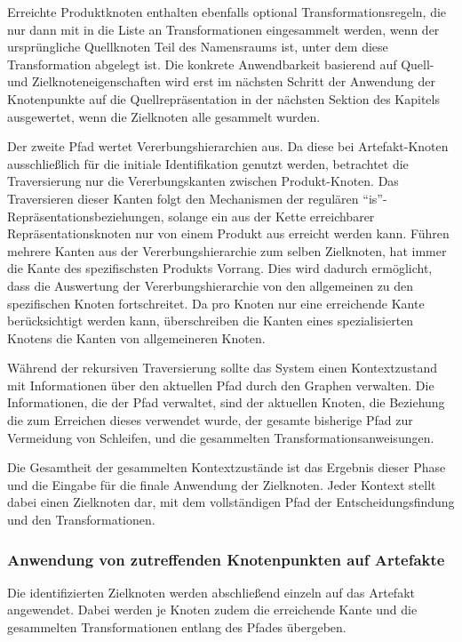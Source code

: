 Erreichte Produktknoten enthalten ebenfalls optional Transformationsregeln, die nur dann mit in die Liste an Transformationen eingesammelt werden, wenn der ursprüngliche Quellknoten Teil des Namensraums ist, unter dem diese Transformation abgelegt ist.
Die konkrete Anwendbarkeit basierend auf Quell- und Zielknoteneigenschaften wird erst im nächsten Schritt der Anwendung der Knotenpunkte auf die Quellrepräsentation in der nächsten Sektion des Kapitels ausgewertet, wenn die Zielknoten alle gesammelt wurden.

Der zweite Pfad wertet Vererbungshierarchien aus.
Da diese bei Artefakt-Knoten ausschließlich für die initiale Identifikation genutzt werden, betrachtet die Traversierung nur die Vererbungskanten zwischen Produkt-Knoten.
Das Traversieren dieser Kanten folgt den Mechanismen der regulären \enquote{is}-Repräsentationsbeziehungen, solange ein aus der Kette erreichbarer Repräsentationsknoten nur von einem Produkt aus erreicht werden kann.
Führen mehrere Kanten aus der Vererbungshierarchie zum selben Zielknoten, hat immer die Kante des spezifischsten Produkts Vorrang.
Dies wird dadurch ermöglicht, dass die Auswertung der Vererbungshierarchie von den allgemeinen zu den spezifischen Knoten fortschreitet.
Da pro Knoten nur eine erreichende Kante berücksichtigt werden kann, überschreiben die Kanten eines spezialisierten Knotens die Kanten von allgemeineren Knoten.

Während der rekursiven Traversierung sollte das System einen Kontextzustand mit Informationen über den aktuellen Pfad durch den Graphen verwalten.
Die Informationen, die der Pfad verwaltet, sind der aktuellen Knoten, die Beziehung die zum Erreichen dieses verwendet wurde, der gesamte bisherige Pfad zur Vermeidung von Schleifen, und die gesammelten Transformationsanweisungen.

Die Gesamtheit der gesammelten Kontextzustände ist das Ergebnis dieser Phase und die Eingabe für die finale Anwendung der Zielknoten.
Jeder Kontext stellt dabei einen Zielknoten dar, mit dem vollständigen Pfad der Entscheidungsfindung und den Transformationen.

\subsubsection{Anwendung von zutreffenden Knotenpunkten auf Artefakte}\label{subsubsec:model-result-processing-apply-nodes-to-artifact}

Die identifizierten Zielknoten werden abschließend einzeln auf das Artefakt angewendet.
Dabei werden je Knoten zudem die erreichende Kante und die gesammelten Transformationen entlang des Pfades übergeben.

